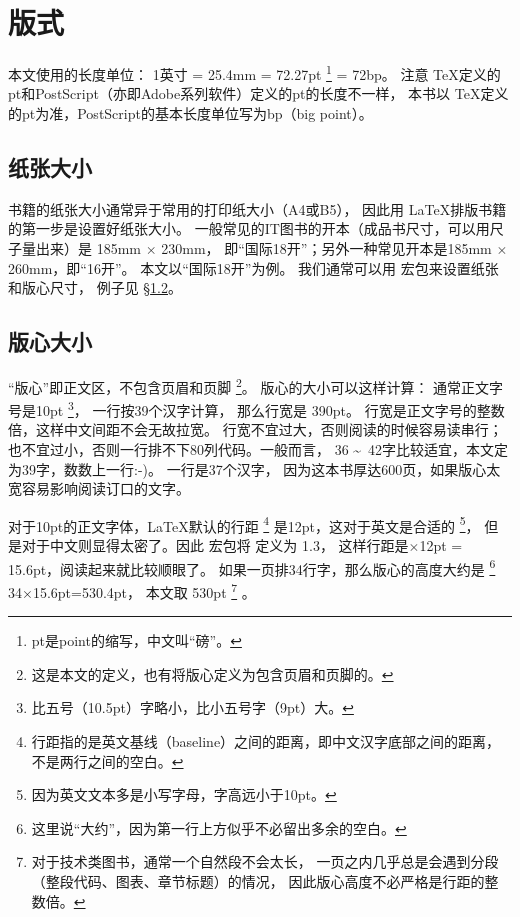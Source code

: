 \chapter{版式}

本文使用的长度单位：
1英寸 = 25.4mm = 72.27pt \footnote{pt是point的缩写，中文叫“磅”。} = 72bp。
注意 \TeX 定义的pt和PostScript（亦即Adobe系列软件）定义的pt的长度不一样，
本书以 \TeX 定义的pt为准，Post\-Script的基本长度单位写为bp（big point）。

\section{纸张大小} %

书籍的纸张大小通常异于常用的打印纸大小（A4或B5），
因此用 \LaTeX 排版书籍的第一步是设置好纸张大小。
一般常见的IT图书的开本（成品书尺寸，可以用尺子量出来）是 185mm $\times$ 230mm，
即“国际18开”；另外一种常见开本是185mm $\times$ 260mm，即“16开”。
本文以“国际18开”为例。
我们通常可以用  宏包来设置纸张和版心尺寸，
例子见 \S \ref{sec:textbody}。

\section{版心大小} %
\label{sec:textbody}

“版心”即正文区，不包含页眉和页脚
\footnote{这是本文的定义，也有将版心定义为包含页眉和页脚的。}。
版心的大小可以这样计算：
通常正文字号是10pt
\footnote{比五号（10.5pt）字略小，比小五号字（9pt）大。}，
一行按39个汉字计算，
那么行宽是 390pt。
行宽是正文字号的整数倍，这样中文间距不会无故拉宽。
行宽不宜过大，否则阅读的时候容易读串行；
也不宜过小，否则一行排不下80列代码。一般而言，
36 \textasciitilde\ 42字比较适宜，本文定为39字，数数上一行:-)。
\mybooktitle 一行是37个汉字，
因为这本书厚达600页，如果版心太宽容易影响阅读订口的文字。

对于10pt的正文字体，\LaTeX 默认的行距
\footnote{行距指的是英文基线（baseline）之间的距离，即中文汉字底部之间的距离，
不是两行之间的空白。} 是12pt，这对于英文是合适的
\footnote{因为英文文本多是小写字母，字高远小于10pt。}，
但是对于中文则显得太密了。因此 \CTeX 宏包将  定义为 1.3，
这样行距是$\times$12pt = 15.6pt，阅读起来就比较顺眼了。
如果一页排34行字，那么版心的高度大约是 \nolinebreak
\footnote{这里说“大约”，因为第一行上方似乎不必留出多余的空白。} 34$\times$15.6pt=530.4pt，
本文取 530pt
\footnote{对于技术类图书，通常一个自然段不会太长，
一页之内几乎总是会遇到分段（整段代码、图表、章节标题）的情况，
因此版心高度不必严格是行距的整数倍。} 。

